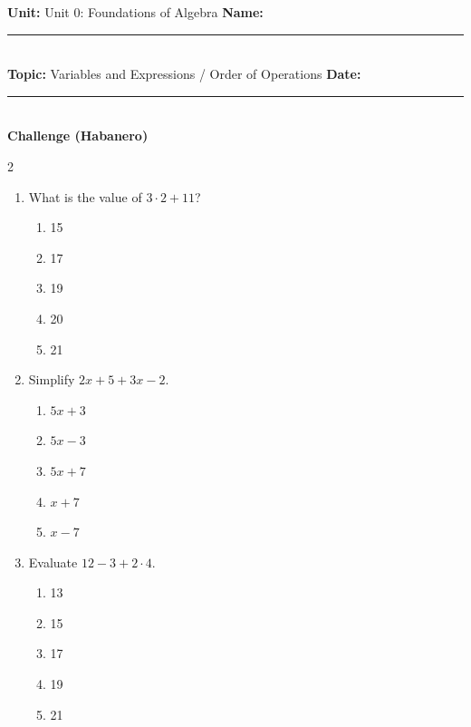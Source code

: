 \documentclass[10pt]{article}
\begin{document}
\enlargethispage{2.5cm}

\begin{tcolorbox}[colback=mainblue!5, colframe=mainblue, sharp corners, boxrule=0.5pt]
    \small \textbf{Unit:} Unit 0: Foundations of Algebra \hfill \textbf{Name:} \rule{3cm}{0.4pt} \\
    \small \textbf{Topic:} Variables and Expressions / Order of Operations \hfill \textbf{Date:} \rule{2cm}{0.4pt} \\
    \centering \textbf{\large Challenge (Habanero)}
\end{tcolorbox}

\vspace{0.2cm}

\begin{multicols}{2}
\begin{enumerate}[label=\textbf{Q\arabic*.}, leftmargin=*, itemsep=6pt, parsep=0pt]

  \item \small What is the value of $3 \cdot 2 + 11$?
  \begin{enumerate}[label=(\Alph*), leftmargin=0.6cm, nosep, itemsep=2pt]
    \item 15
    \item 17
    \item 19
    \item 20
    \item 21
  \end{enumerate}

  \item \small Simplify $2x + 5 + 3x - 2$. 
  \begin{enumerate}[label=(\Alph*), leftmargin=0.6cm, nosep, itemsep=2pt]
    \item $5x + 3$
    \item $5x - 3$
    \item $5x + 7$
    \item $x + 7$
    \item $x - 7$
  \end{enumerate}

  \item \small Evaluate $12 - 3 + 2 \cdot 4$.
  \begin{enumerate}[label=(\Alph*), leftmargin=0.6cm, nosep, itemsep=2pt]
    \item 13
    \item 15
    \item 17
    \item 19
    \item 21
  \end{enumerate}


\end{enumerate}
\end{multicols}
\end{document}
